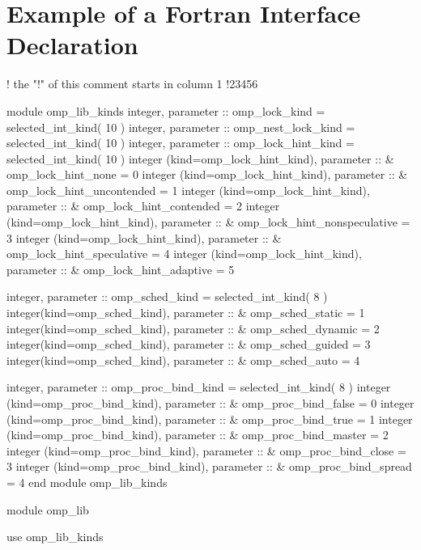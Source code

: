 \pagebreak
\section{Example of a Fortran Interface Declaration }
\label{sec:Example of a Fortran Interface Declaration module}
{\small \begin{codepar}
!      the "!" of this comment starts in column 1
!23456

        module omp\_lib\_kinds
        integer, parameter :: omp\_lock\_kind = selected\_int\_kind( 10 )
        integer, parameter :: omp\_nest\_lock\_kind = selected\_int\_kind( 10 )
        integer, parameter :: omp\_lock\_hint\_kind = selected\_int\_kind( 10 )
        integer (kind=omp\_lock\_hint\_kind), parameter :: 
      \&   omp\_lock\_hint\_none = 0
        integer (kind=omp\_lock\_hint\_kind), parameter :: 
      \&   omp\_lock\_hint\_uncontended = 1
        integer (kind=omp\_lock\_hint\_kind), parameter :: 
      \&   omp\_lock\_hint\_contended = 2
        integer (kind=omp\_lock\_hint\_kind), parameter :: 
      \&   omp\_lock\_hint\_nonspeculative = 3 
        integer (kind=omp\_lock\_hint\_kind), parameter :: 
      \&   omp\_lock\_hint\_speculative = 4
        integer (kind=omp\_lock\_hint\_kind), parameter :: 
      \&   omp\_lock\_hint\_adaptive = 5

        integer, parameter :: omp\_sched\_kind = selected\_int\_kind( 8 ) 
        integer(kind=omp\_sched\_kind), parameter ::
      \&   omp\_sched\_static = 1
        integer(kind=omp\_sched\_kind), parameter ::
      \&   omp\_sched\_dynamic = 2
        integer(kind=omp\_sched\_kind), parameter ::
      \&   omp\_sched\_guided = 3
        integer(kind=omp\_sched\_kind), parameter ::
      \&   omp\_sched\_auto = 4
      
        integer, parameter :: omp\_proc\_bind\_kind = selected\_int\_kind( 8 )
        integer (kind=omp\_proc\_bind\_kind), parameter ::
      \&   omp\_proc\_bind\_false = 0
        integer (kind=omp\_proc\_bind\_kind), parameter ::
      \&   omp\_proc\_bind\_true = 1
        integer (kind=omp\_proc\_bind\_kind), parameter ::
      \&   omp\_proc\_bind\_master = 2
        integer (kind=omp\_proc\_bind\_kind), parameter ::
      \&   omp\_proc\_bind\_close = 3
        integer (kind=omp\_proc\_bind\_kind), parameter ::
      \&   omp\_proc\_bind\_spread = 4
         end module omp\_lib\_kinds

        module omp\_lib

          use omp\_lib\_kinds


\end{codepar}}

